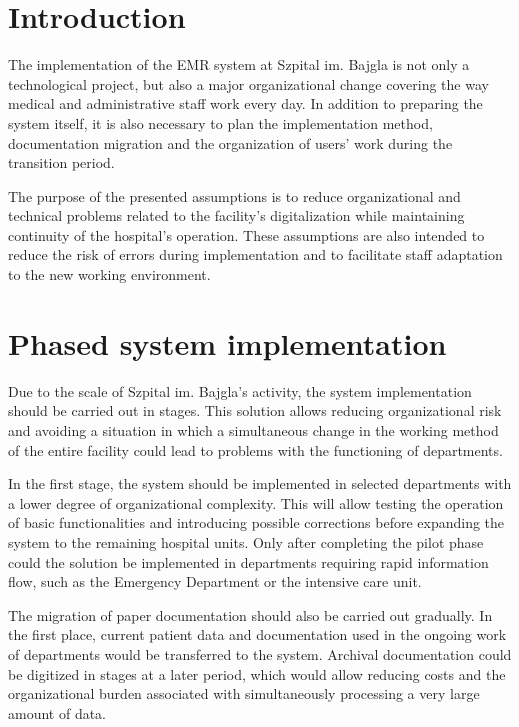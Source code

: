 \label{chapter:implementation}

\section{Introduction}

The implementation of the EMR system at Szpital im. Bajgla is not only a technological project, but also a major organizational change covering the way medical and administrative staff work every day. In addition to preparing the system itself, it is also necessary to plan the implementation method, documentation migration and the organization of users' work during the transition period.

The purpose of the presented assumptions is to reduce organizational and technical problems related to the facility's digitalization while maintaining continuity of the hospital's operation. These assumptions are also intended to reduce the risk of errors during implementation and to facilitate staff adaptation to the new working environment.

\section{Phased system implementation}

Due to the scale of Szpital im. Bajgla's activity, the system implementation should be carried out in stages. This solution allows reducing organizational risk and avoiding a situation in which a simultaneous change in the working method of the entire facility could lead to problems with the functioning of departments.

In the first stage, the system should be implemented in selected departments with a lower degree of organizational complexity. This will allow testing the operation of basic functionalities and introducing possible corrections before expanding the system to the remaining hospital units. Only after completing the pilot phase could the solution be implemented in departments requiring rapid information flow, such as the Emergency Department or the intensive care unit.

The migration of paper documentation should also be carried out gradually. In the first place, current patient data and documentation used in the ongoing work of departments would be transferred to the system. Archival documentation could be digitized in stages at a later period, which would allow reducing costs and the organizational burden associated with simultaneously processing a very large amount of data.

